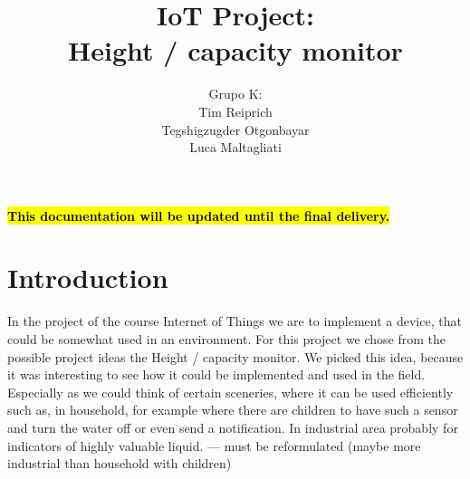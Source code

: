 \documentclass{article}
\title{IoT Project: \\Height / capacity monitor}
\author{Grupo K: \\ Tim Reiprich \\ Tegshigzugder Otgonbayar \\ Luca Maltagliati}
\begin{document}
\pagestyle{plain}  %

\maketitle


\newpage

\textcolor{red}{\textbf{\hl{This documentation will be updated until the final
      delivery.}}}

\tableofcontents %
\newpage




\section{Introduction}

In the project of the course Internet of Things we are to implement a device,
that could be somewhat used in an environment. For this project we chose from
the possible project ideas the Height / capacity monitor. We picked this idea,
because it was interesting to see how it could be implemented and used in the
field. Especially as we could think of certain sceneries, where it can be used
efficiently such as, in household, for example where there are children to have
such a sensor and turn the water off or even send a notification. In industrial
area probably for indicators of highly valuable liquid. --- must be reformulated
(maybe more industrial than household with children)
\end{document}
